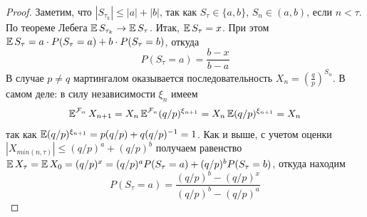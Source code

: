 \begin{proof}
    Заметим, что $|S_{\tau_k}| \leq |a| + |b|$, так как $S_{\tau} \in \{a, b\}$, $S_n \in (a, b)$, если $n < \tau$. По теореме Лебега $\operatorname{\mathbb{E}} S_{\tau_k} \to \operatorname{\mathbb{E}} S_{\tau}$. Итак, $\operatorname{\mathbb{E}} S_{\tau} = x$. При этом
    $\operatorname{\mathbb{E}} S_{\tau} = a \cdot P(S_\tau = a) + b \cdot P(S_\tau = b)$, откуда
    \begin{equation*}
        P(S_\tau = a) = \frac{b-x}{b-a}
    \end{equation*}
    В случае $p \neq q$ мартингалом оказывается последовательность $X_n = (\frac{q}{p})^{S_n}$. В самом деле: в силу независимости $\xi_n$ имеем
    \begin{equation*}
        \operatorname{\mathbb{E}}^{\mathcal{F}_n}X_{n+1} = X_n \operatorname{\mathbb{E}}^{\mathcal{F}_n}(q/p)^{\xi_{n+1}} = X_n \operatorname{\mathbb{E}}(q/p)^{\xi_{n+1}} = X_n
    \end{equation*}
    так как $\operatorname{\mathbb{E}}(q/p)^{\xi_{n+1}} = p(q/p) + q(q/p)^{-1} = 1$. Как и выше, с учетом
оценки $|X_{min(n,\tau)}| \leq (q/p)^a + (q/p)^b$ получаем равенство $\operatorname{\mathbb{E}} X_\tau = \operatorname{\mathbb{E}} X_0 = (q/p)^x=(q/p)^a P(S_\tau=a)+(q/p)^b P(S_\tau = b)$, откуда находим
    \begin{equation*}
        P(S_\tau = a) = \frac{(q/p)^b - (q/p)^x}{(q/p)^b - (q/p)^a}
    \end{equation*}

\end{proof}
